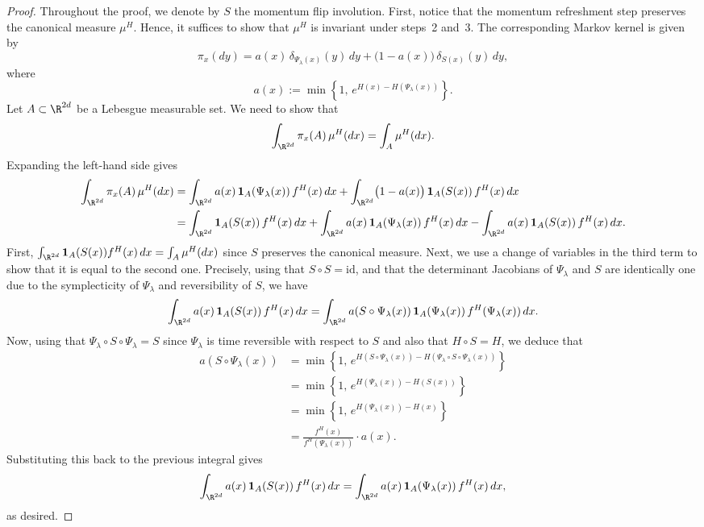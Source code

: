 \begin{proof}
Throughout the proof, we denote by $S$ the momentum flip involution. First, notice that the
momentum refreshment step preserves the canonical measure $\mu^H$. Hence, it suffices to show
that $\mu^H$ is invariant under steps~2 and~3. The corresponding Markov kernel is given by
\[
\pi_x(dy) = a(x)\,\delta_{\Psi_\lambda(x)}(y)\,dy
+ \bigl(1 - a(x)\bigr)\,\delta_{S(x)}(y)\,dy,
\]
where
\[
a(x) := \min\!\left\{1,\, e^{H(x) - H(\Psi_\lambda(x))}\right\}.
\]
Let $A \subset \R^{2d}$ be a Lebesgue measurable set. We need to show that
\[
\int_{\R^{2d}} \pi_x(A)\,\mu^H(dx) = \int_A \mu^H(dx).
\]
Expanding the left-hand side gives
\begin{align*}
\int_{\R^{2d}} \pi_x(A)\,\mu^H(dx)
&= \int_{\R^{2d}} a(x)\,\mathbf{1}_A\!\left(\Psi_\lambda(x)\right) f^H(x)\,dx
  + \int_{\R^{2d}} \bigl(1-a(x)\bigr)\,\mathbf{1}_A\!\left(S(x)\right) f^H(x)\,dx \\
&= \int_{\R^{2d}} \mathbf{1}_A\!\left(S(x)\right) f^H(x)\,dx
  + \int_{\R^{2d}} a(x)\,\mathbf{1}_A\!\left(\Psi_\lambda(x)\right) f^H(x)\,dx
  - \int_{\R^{2d}} a(x)\,\mathbf{1}_A\!\left(S(x)\right) f^H(x)\,dx.
\end{align*}
First, $\int_{\R^{2d}} \mathbf{1}_A(S(x)) f^H(x)\,dx = \int_A \mu^H(dx)$ since $S$ preserves
the canonical measure. Next, we use a change of variables in the third term to show that it is
equal to the second one. Precisely, using that $S \circ S = \mathrm{id}$, and that the
determinant Jacobians of $\Psi_\lambda$ and $S$ are identically one due to the symplecticity of
$\Psi_\lambda$ and reversibility of $S$, we have
\[
\int_{\R^{2d}} a(x)\,\mathbf{1}_A\!\left(S(x)\right) f^H(x)\,dx
= \int_{\R^{2d}} a\!\left(S \circ \Psi_\lambda(x)\right)
  \mathbf{1}_A\!\left(\Psi_\lambda(x)\right) f^H\!\left(\Psi_\lambda(x)\right) dx.
\]
Now, using that $\Psi_\lambda \circ S \circ \Psi_\lambda = S$ since $\Psi_\lambda$ is time
reversible with respect to $S$ and also that $H \circ S = H$, we deduce that
\begin{align*}
a\!\left(S \circ \Psi_\lambda(x)\right)
&= \min\!\left\{1,\, e^{H(S \circ \Psi_\lambda(x)) - H(\Psi_\lambda \circ S \circ \Psi_\lambda(x))}\right\} \\
&= \min\!\left\{1,\, e^{H(\Psi_\lambda(x)) - H(S(x))}\right\} \\
&= \min\!\left\{1,\, e^{H(\Psi_\lambda(x)) - H(x)}\right\} \\
&= \frac{f^H(x)}{f^H\!\left(\Psi_\lambda(x)\right)}\cdot a(x).
\end{align*}
Substituting this back to the previous integral gives
\[
\int_{\R^{2d}} a(x)\,\mathbf{1}_A\!\left(S(x)\right) f^H(x)\,dx
= \int_{\R^{2d}} a(x)\,\mathbf{1}_A\!\left(\Psi_\lambda(x)\right) f^H(x)\,dx,
\]
as desired.
\end{proof}
